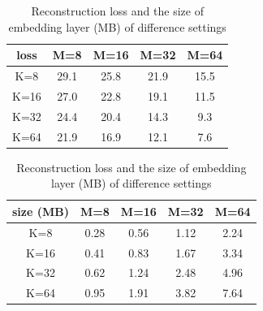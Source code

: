 \documentclass{article} %
\begin{document}
\begin{table}[t]
    \begin{minipage}{.5\linewidth}
    \centering
    
    \begin{tabular}{c|cccc}
    \hline \hline
    {loss} & {M=8} & {M=16} & {M=32} & {M=64} \\
    \hline
    {K=8} & 29.1 & 25.8 & 21.9 & 15.5 \\ 
    {K=16} & 27.0 & 22.8 & 19.1 & 11.5 \\ 
    {K=32} & 24.4 & 20.4 & 14.3 & 9.3 \\ 
    {K=64} & 21.9 & 16.9 & 12.1 & 7.6 \\
    \hline \hline
    \end{tabular}
   
    \end{minipage}%
    \begin{minipage}{.5\linewidth}
      \centering
        
    \begin{tabular}{c|cccc}
    \hline \hline
    {size (MB)} & {M=8} & {M=16} & {M=32} & {M=64} \\
    \hline
    {K=8} & 0.28 & 0.56 & 1.12 & 2.24 \\ 
    {K=16} & 0.41 & 0.83 & 1.67 & 3.34 \\ 
    {K=32} & 0.62 & 1.24 & 2.48 & 4.96 \\ 
    {K=64} & 0.95 & 1.91 & 3.82 & 7.64 \\
    \hline \hline
    \end{tabular}
        
    \end{minipage} 
    \caption{Reconstruction loss and the size of embedding layer (MB) of difference settings}
    \label{table:imdb_loss}
\end{table}
\end{document}
